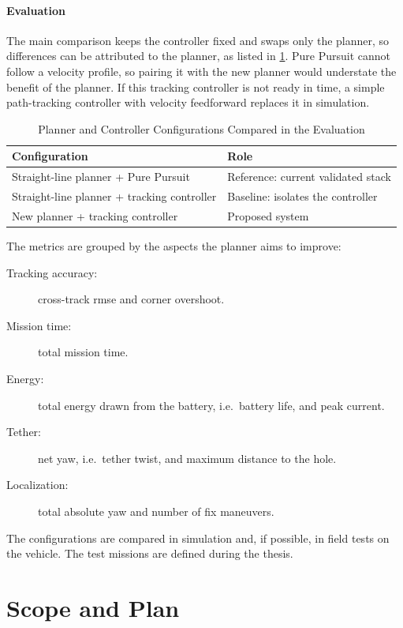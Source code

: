 \documentclass[article,notoc]{IDSCreport}
\begin{document}
\paragraph{Evaluation} The main comparison keeps the controller fixed and
swaps only the planner, so differences can be attributed to the planner, as
listed in \cref{tab:Configurations}. Pure Pursuit cannot follow a velocity
profile, so pairing it with the new planner would understate the benefit of
the planner. If this tracking controller is not ready in time, a simple
path-tracking controller with velocity feedforward replaces it in simulation.

\begin{table}[htbp]
    \centering
    \caption{Planner and Controller Configurations Compared in the Evaluation}
    \label{tab:Configurations}
    \begin{tabular}{ll}
        \toprule
        Configuration                        & Role \\
        \midrule
        Straight-line planner + Pure Pursuit & Reference: current validated stack \\
        Straight-line planner + tracking controller & Baseline: isolates the controller \\
        New planner + tracking controller           & Proposed system \\
        \bottomrule
    \end{tabular}
\end{table}

The metrics are grouped by the aspects the planner aims to improve:
\begin{description}
    \item[Tracking accuracy:] cross-track \ac{rmse} and corner overshoot.
    \item[Mission time:] total mission time.
    \item[Energy:] total energy drawn from the battery, i.e.\ battery life, and
          peak current.
    \item[Tether:] net yaw, i.e.\ tether twist, and maximum distance to the hole.
    \item[Localization:] total absolute yaw and number of fix maneuvers.
\end{description}
The configurations are compared in simulation and, if possible, in field tests
on the vehicle. The test missions are defined during the thesis.

\section{Scope and Plan}
\label{sec:ScopeAndPlan}
\end{document}
